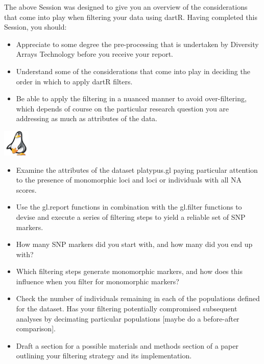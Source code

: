 \documentclass[
  letterpaper,
  DIV=11,
  numbers=noendperiod]{scrreprt}
\providecommand{\tightlist}{%
  \setlength{\itemsep}{0pt}\setlength{\parskip}{0pt}}\usepackage{longtable,booktabs,array}
\begin{document}
The above Session was designed to give you an overview of the
considerations that come into play when filtering your data using dartR.
Having completed this Session, you should:

\begin{itemize}
\tightlist
\item
  Appreciate to some degree the pre-processing that is undertaken by
  Diversity Arrays Technology before you receive your report.
\item
  Understand some of the considerations that come into play in deciding
  the order in which to apply dartR filters.
\item
  Be able to apply the filtering in a nuanced manner to avoid
  over-filtering, which depends of course on the particular research
  question you are addressing as much as attributes of the data.
\end{itemize}

\begin{tcolorbox}[enhanced jigsaw, coltitle=black, colframe=quarto-callout-note-color-frame, colbacktitle=quarto-callout-note-color!10!white, breakable, bottomtitle=1mm, rightrule=.15mm, opacitybacktitle=0.6, left=2mm, arc=.35mm, opacityback=0, leftrule=.75mm, toptitle=1mm, titlerule=0mm, title=\textcolor{quarto-callout-note-color}{\faInfo}\hspace{0.5em}{Exercise 1: Filtering the Platypus dataset}, bottomrule=.15mm, toprule=.15mm, colback=white]

\includegraphics[width=0.5in,height=0.5in]{images/task.png}

\begin{itemize}
\tightlist
\item
  Examine the attributes of the dataset platypus.gl paying particular
  attention to the presence of monomorphic loci and loci or individuals
  with all NA scores.
\item
  Use the gl.report functions in combination with the gl.filter
  functions to devise and execute a series of filtering steps to yield a
  reliable set of SNP markers.
\item
  How many SNP markers did you start with, and how many did you end up
  with?
\item
  Which filtering steps generate monomorphic markers, and how does this
  influence when you filter for monomorphic markers?
\item
  Check the number of individuals remaining in each of the populations
  defined for the dataset. Has your filtering potentially compromised
  subsequent analyses by decimating particular populations {[}maybe do a
  before-after comparison{]}.
\item
  Draft a section for a possible materials and methods section of a
  paper outlining your filtering strategy and its implementation.
\end{itemize}

\end{tcolorbox}
\end{document}
